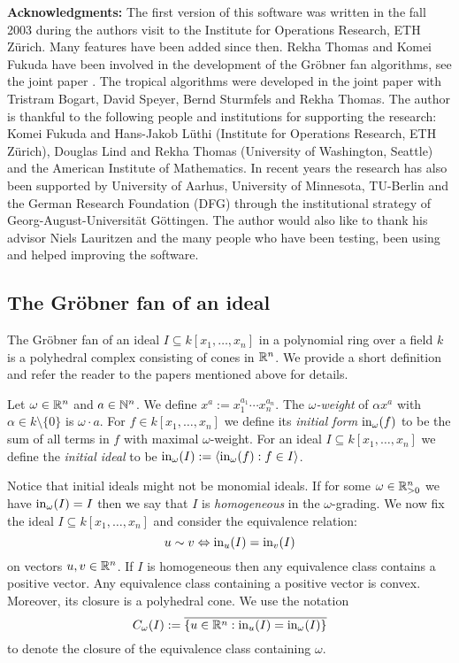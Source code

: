 \vspace{1cm}
\noindent
{\bf Acknowledgments:} The first version of this software was written
in the fall 2003 during the authors visit to the Institute for
Operations Research, ETH Z\"urich. Many features have been added since
then. Rekha Thomas and Komei Fukuda have been involved in the
development of the Gr\"obner fan algorithms, see the joint paper
\cite{fukuda}. The tropical algorithms were developed in the joint
paper \cite{ctv} with Tristram Bogart, David Speyer, Bernd Sturmfels
and Rekha Thomas. The author is thankful to the following people and
institutions for supporting the research: Komei Fukuda and Hans-Jakob
L\"uthi (Institute for Operations Research, ETH Z\"urich), Douglas
Lind and Rekha Thomas (University of Washington, Seattle) and the
American Institute of Mathematics. In recent years the research has
also been supported by University of Aarhus, University of Minnesota, TU-Berlin and the German Research Foundation (DFG) through the institutional strategy of Georg-August-Universit\"at G\"ottingen. The author would also like to thank his advisor Niels
Lauritzen and the many people who have been testing, been using and helped improving the software.


\subsection{The Gr\"obner fan of an ideal}
The Gr\"obner fan of an ideal $I\subseteq k[x_1,\dots,x_n]$ in a polynomial ring over a field $k$ is a
polyhedral complex consisting of cones in $\mathbb{R}^n$. 
We provide a short definition and refer the reader to the papers mentioned above for details.
\begin{definition}
Let $\omega\in\mathbb{R}^n$ and $a\in\mathbb{N}^n$. We define $x^a:=x_1^{a_1}\cdots
x_n^{a_n}$. The \emph{$\omega$-weight} of $\alpha x^a$ with
$\alpha\in k\setminus\{0\}$ is $\omega\cdot a$. For $f\in
k[x_1,\dots,x_n]$ we define its \emph{initial form} $\textup{in}_\omega(f)$ to be
the sum of all terms in $f$ with maximal $\omega$-weight. For an ideal
$I\subseteq k[x_1,\dots,x_n]$ we define the \emph{initial ideal} to be
$\textup{in}_\omega(I):=\langle \textup{in}_\omega(f):f\in I\rangle$.
\end{definition}
Notice that initial ideals might not be monomial ideals. If for some
$\omega\in\mathbb{R}_{>0}^n$ we have $\textup{in}_\omega(I)=I$ then we say that $I$
is \emph{homogeneous} in the $\omega$-grading. We now fix the
ideal $I\subseteq k[x_1,\dots,x_n]$ and consider the equivalence
relation:
$$u\sim v \Leftrightarrow \textup{in}_u(I)=\textup{in}_v(I)$$ on vectors $u,v\in
\mathbb{R}^n$. If $I$ is homogeneous then any equivalence class contains a
positive vector. Any equivalence class containing a positive vector is
convex. Moreover, its closure is a polyhedral cone. We use the notation
$$C_\omega(I):=\overline{\{u\in\mathbb{R}^n:\textup{in}_u(I)=\textup{in}_\omega(I)\}}$$
to denote the closure of the equivalence class containing $\omega$.


